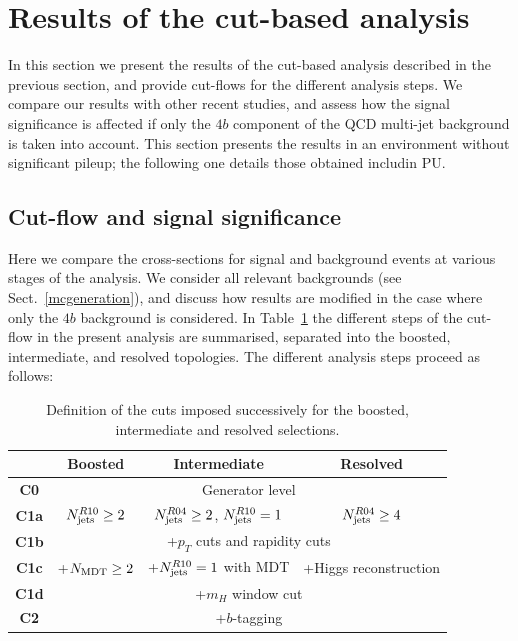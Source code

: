 \section{Results of the cut-based analysis}

\label{sec:results}

In this section we present the results of the 
cut-based analysis described in the previous section, and provide 
cut-flows for the different analysis steps.
%
We
compare our results with other recent studies,
and assess how the signal significance
is affected if only the $4b$ component of the
QCD multi-jet background is taken into account.
%
This section presents the results in an environment without significant
pileup; the following one details those obtained includin PU.

\subsection{Cut-flow and signal significance}

Here we compare the cross-sections for
signal and background events at various
stages of the analysis.
%
We consider all relevant backgrounds (see Sect.~\ref{mcgeneration}),
and discuss how results are modified in the case where only the $4b$
background is considered.
%
In Table~\ref{tab:cutflowdetails}
the different
steps of the cut-flow in the present analysis are summarised,
separated into the boosted, intermediate,
    and resolved topologies.
    The different analysis steps proceed as follows:
   

\begin{table}[t]
  \centering
  \begin{tabular}{|c|c|c|c|}
\hline
&  Boosted  &   Intermediate &  Resolved  \\
\hline
\hline
{\bf C0} &  \multicolumn{3}{c|}{Generator level} \\
\hline
{\bf C1a} & $N_{\rm jets}^{R10}\ge 2$ & $N_{\rm jets}^{R04}\ge 2$, $N_{\rm jets}^{R10}=1$  &
$N_{\rm jets}^{R04}\ge 4$ \\
\hline
{\bf  C1b} & \multicolumn{3}{c|}{+$p_T$ cuts and rapidity cuts} \\
\hline
 {\bf C1c} & +$N_{\rm MDT}\ge 2$ & +$N_{\rm jets}^{R10}=1$ with MDT  &
 +Higgs reconstruction \\
 \hline
{\bf C1d} & \multicolumn{3}{c|}{ +$m_H$ window cut} \\
\hline
{\bf C2} & \multicolumn{3}{c|}{+$b$-tagging}    \\
\hline
  \end{tabular}
  \caption{\small Definition of the cuts imposed successively for the boosted, intermediate
    and resolved selections.
      \label{tab:cutflowdetails}
  }
\end{table}


